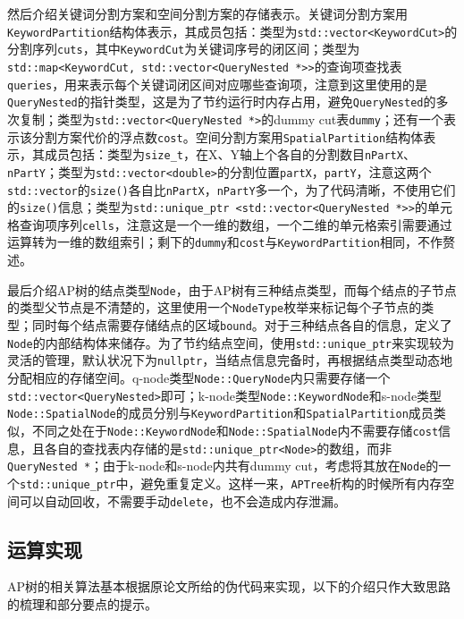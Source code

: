 \documentclass[UTF8]{ctexart}
\begin{document}
然后介绍关键词分割方案和空间分割方案的存储表示。关键词分割方案用\texttt{KeywordPartition}结构体表示，其成员包括：类型为\texttt{std::vector<KeywordCut>}的分割序列\texttt{cuts}，其中\texttt{KeywordCut}为关键词序号的闭区间；类型为\texttt{std::map<KeywordCut, std::vector<QueryNested *>>}的查询项查找表\texttt{queries}，用来表示每个关键词闭区间对应哪些查询项，注意到这里使用的是\texttt{QueryNested}的指针类型，这是为了节约运行时内存占用，避免\texttt{QueryNested}的多次复制；类型为\texttt{std::vector<QueryNested *>}的dummy cut表\texttt{dummy}；还有一个表示该分割方案代价的浮点数\texttt{cost}。空间分割方案用\texttt{SpatialPartition}结构体表示，其成员包括：类型为\texttt{size\_t}，在X、Y轴上个各自的分割数目\texttt{nPartX}、\texttt{nPartY}；类型为\texttt{std::vector<double>}的分割位置\texttt{partX}，\texttt{partY}，注意这两个\texttt{std::vector}的\texttt{size()}各自比\texttt{nPartX}，\texttt{nPartY}多一个，为了代码清晰，不使用它们的\texttt{size()}信息；类型为\texttt{std::unique\_ptr <std::vector<QueryNested *>>}的单元格查询项序列\texttt{cells}，注意这是一个一维的数组，一个二维的单元格索引需要通过运算转为一维的数组索引；剩下的\texttt{dummy}和\texttt{cost}与\texttt{KeywordPartition}相同，不作赘述。

最后介绍AP树的结点类型\texttt{Node}，由于AP树有三种结点类型，而每个结点的子节点的类型父节点是不清楚的，这里使用一个\texttt{NodeType}枚举来标记每个子节点的类型；同时每个结点需要存储结点的区域\texttt{bound}。对于三种结点各自的信息，定义了\texttt{Node}的内部结构体来储存。为了节约结点空间，使用\texttt{std::unique\_ptr}来实现较为灵活的管理，默认状况下为\texttt{nullptr}，当结点信息完备时，再根据结点类型动态地分配相应的存储空间。q-node类型\texttt{Node::QueryNode}内只需要存储一个\texttt{std::vector<QueryNested>}即可；k-node类型\texttt{Node::KeywordNode}和s-node类型\texttt{Node::SpatialNode}的成员分别与\texttt{KeywordPartition}和\texttt{SpatialPartition}成员类似，不同之处在于\texttt{Node::KeywordNode}和\texttt{Node::SpatialNode}内不需要存储\texttt{cost}信息，且各自的查找表内存储的是\texttt{std::unique\_ptr<Node>}的数组，而非\texttt{QueryNested *}；由于k-node和s-node内共有dummy cut，考虑将其放在\texttt{Node}的一个\texttt{std::unique\_ptr}中，避免重复定义。这样一来，\texttt{APTree}析构的时候所有内存空间可以自动回收，不需要手动\texttt{delete}，也不会造成内存泄漏。

\subsection{运算实现}
AP树的相关算法基本根据原论文所给的伪代码来实现，以下的介绍只作大致思路的梳理和部分要点的提示。
\end{document}
